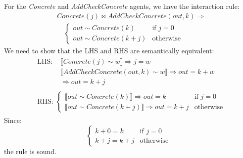 \begin{lemma}
	For the \textit{Concrete} and \textit{AddCheckConcrete} agents, we have the interaction rule:
	$$
	\begin{aligned}
		& \mathit{Concrete}(j) \bowtie \mathit{AddCheckConcrete}(\mathit{out}, k) \Rightarrow \\
		& \quad \begin{cases}
			\mathit{out} \sim \mathit{Concrete}(k) & \text{if } j = 0 \\
			\mathit{out} \sim \mathit{Concrete}(k + j) & \text{otherwise}
		\end{cases}
	\end{aligned}
	$$
	We need to show that the LHS and RHS are semantically equivalent:
	$$
	\begin{aligned}
		& \begin{aligned}
			\text{LHS: } & \llbracket \mathit{Concrete}(j) \sim w \rrbracket \Rightarrow j = w \\
			& \llbracket \mathit{AddCheckConcrete}(\mathit{out}, k) \sim w \rrbracket \Rightarrow \mathit{out} = k + w \\
			& \Rightarrow \mathit{out} = k + j
		\end{aligned} \\
		& \begin{aligned}
			\text{RHS: }
			\begin{cases}
				\llbracket \mathit{out} \sim \mathit{Concrete}(k) \rrbracket \Rightarrow \mathit{out} = k & \text{if } j = 0 \\
				\llbracket \mathit{out} \sim \mathit{Concrete}(k + j) \rrbracket \Rightarrow \mathit{out} = k + j & \text{otherwise}
			\end{cases}
		\end{aligned}
	\end{aligned}
	$$
	Since:
	$$
	\begin{cases}
		k + 0 = k & \text{if } j = 0 \\
		k + j = k + j & \text{otherwise}
	\end{cases}
	$$
	the rule is sound.
\end{lemma}

